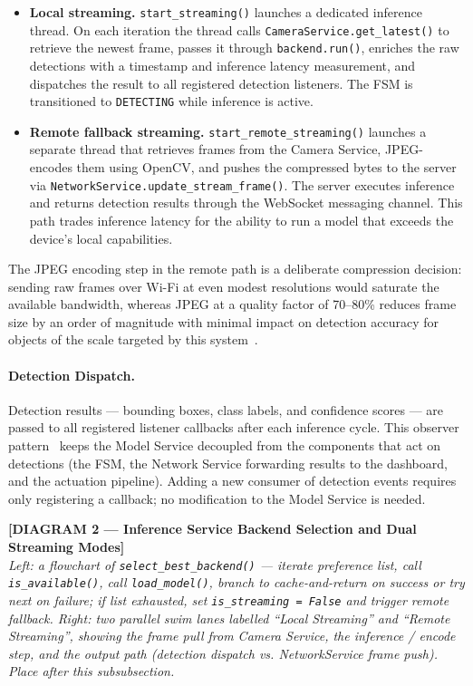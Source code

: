 \begin{itemize}
	\item \textbf{Local streaming.} \texttt{start\_streaming()}
	launches a dedicated inference thread. On each iteration
	the thread calls \texttt{CameraService.get\_latest()} to
	retrieve the newest frame, passes it through
	\texttt{backend.run()}, enriches the raw detections with
	a timestamp and inference latency measurement, and
	dispatches the result to all registered detection listeners.
	The FSM is transitioned to \texttt{DETECTING} while
	inference is active.
	
	\item \textbf{Remote fallback streaming.}
	\texttt{start\_remote\_streaming()} launches a separate
	thread that retrieves frames from the Camera Service,
	JPEG-encodes them using OpenCV, and pushes the compressed
	bytes to the server via
	\texttt{NetworkService.update\_stream\_frame()}. The server
	executes inference and returns detection results through
	the WebSocket messaging channel. This path trades inference
	latency for the ability to run a model that exceeds the
	device's local capabilities.
\end{itemize}

The JPEG encoding step in the remote path is a deliberate compression
decision: sending raw frames over Wi-Fi at even modest resolutions
would saturate the available bandwidth, whereas JPEG at a quality
factor of 70--80\% reduces frame size by an order of magnitude with
minimal impact on detection accuracy for objects of the scale
targeted by this system~\cite{wallace1992jpeg}.

\paragraph{Detection Dispatch.}

Detection results — bounding boxes, class labels, and confidence
scores — are passed to all registered listener callbacks after each
inference cycle. This observer pattern~\cite{gamma1994design} keeps
the Model Service decoupled from the components that act on
detections (the FSM, the Network Service forwarding results to the
dashboard, and the actuation pipeline). Adding a new consumer of
detection events requires only registering a callback; no
modification to the Model Service is needed.

\bigskip
\noindent\textbf{[DIAGRAM 2 — Inference Service Backend Selection
	and Dual Streaming Modes]}\\
\textit{Left: a flowchart of \texttt{select\_best\_backend()} —
	iterate preference list, call \texttt{is\_available()}, call
	\texttt{load\_model()}, branch to cache-and-return on success or try
	next on failure; if list exhausted, set \texttt{is\_streaming =
		False} and trigger remote fallback. Right: two parallel swim lanes
	labelled ``Local Streaming'' and ``Remote Streaming'', showing the
	frame pull from Camera Service, the inference / encode step, and the
	output path (detection dispatch vs. NetworkService frame push). Place
	after this subsubsection.}
\bigskip

